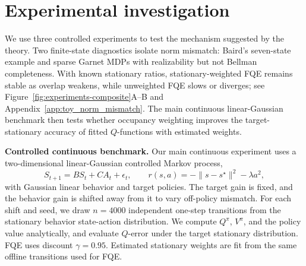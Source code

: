 \documentclass{article}
\theoremstyle{plain}
\theoremstyle{definition}
\theoremstyle{remark}
\begin{document}
 
 


 



\section{Experimental investigation}
\label{sec:experiments}

We use three controlled experiments to test the mechanism suggested by the
theory. Two finite-state diagnostics isolate norm mismatch: Baird's seven-state
example \citep{baird1995residual} and sparse Garnet MDPs with realizability but
not Bellman completeness. With known stationary ratios, stationary-weighted FQE
remains stable as overlap weakens, while unweighted FQE slows or diverges; see
Figure~\ref{fig:experiments-composite}A--B and
Appendix~\ref{app:toy_norm_mismatch}. The main continuous linear-Gaussian
benchmark then tests whether occupancy weighting improves the
target-stationary accuracy of fitted \(Q\)-functions with estimated weights.

\textbf{Controlled continuous benchmark.}
Our main continuous experiment uses a two-dimensional linear-Gaussian controlled
Markov process,
\[
S_{t+1}=B S_t + C A_t+\epsilon_t,\qquad
r(s,a)=-\|s-s^\star\|^2-\lambda a^2 ,
\]
with Gaussian linear behavior and target policies. The target gain is fixed,
and the behavior gain is shifted away from it to vary off-policy mismatch. For
each shift and seed, we draw \(n=4000\) independent one-step transitions from
the stationary behavior state-action distribution. We compute \(Q^\pi\),
\(V^\pi\), and the policy value analytically, and evaluate \(Q\)-error under the
target stationary distribution. FQE uses discount \(\gamma=0.95\). Estimated
stationary weights are fit from the same offline transitions used for FQE.
\end{document}
